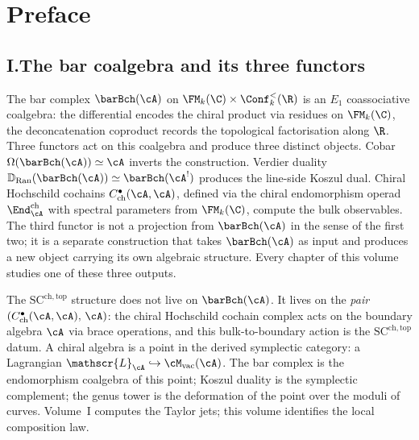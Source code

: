 \providecommand{\cL}{\mathscr{L}}
\providecommand{\cZ}{\mathcal{Z}}
\providecommand{\cH}{\mathcal{H}}
\providecommand{\fg}{\mathfrak{g}}
\providecommand{\cW}{\mathcal{W}}
\providecommand{\gSC}{\mathfrak{g}^{\mathrm{SC}}}
\providecommand{\gAmod}{\mathfrak{g}^{\mathrm{mod}}_\cA}
\providecommand{\Ydg}{Y^{\mathrm{dg}}}
\providecommand{\Zder}{\operatorname{Z}_{\mathrm{der}}}
\providecommand{\Abulk}{A_{\mathrm{bulk}}}
\providecommand{\Bbound}{B_{\partial}}
\providecommand{\mc}{\operatorname{MC}}
\providecommand{\Res}{\operatorname{Res}}
\providecommand{\RHom}{\operatorname{RHom}}

\chapter*{Preface}

\vspace{1em}

\section*{I.\quad The bar coalgebra and its three functors}

\noindent
The bar complex $\barBch(\cA)$ on
$\FM_k(\C) \times \Conf_k^{<}(\R)$ is an $E_1$ coassociative
coalgebra: the differential encodes the chiral product via
residues on $\FM_k(\C)$, the deconcatenation coproduct records
the topological factorisation along $\R$. Three functors act on
this coalgebra and produce three distinct objects. Cobar
$\Omega(\barBch(\cA)) \simeq \cA$ inverts the construction.
Verdier duality
$\mathbb{D}_{\mathrm{Ran}}(\barBch(\cA)) \simeq \barBch(\cA^!)$
produces the line-side Koszul dual. Chiral Hochschild cochains
$C^\bullet_{\mathrm{ch}}(\cA,\cA)$, defined via the chiral
endomorphism operad $\End^{\mathrm{ch}}_\cA$ with spectral
parameters from $\FM_k(\C)$, compute the bulk observables. The
third functor is not a projection from $\barBch(\cA)$ in the
sense of the first two; it is a separate construction that takes
$\barBch(\cA)$ as input and produces a new object carrying its
own algebraic structure. Every chapter of this volume studies one
of these three outputs.

The $\mathrm{SC}^{\mathrm{ch,top}}$ structure does not live on
$\barBch(\cA)$. It lives on the \emph{pair}
$(C^\bullet_{\mathrm{ch}}(\cA,\cA),\, \cA)$: the chiral
Hochschild cochain complex acts on the boundary algebra $\cA$
via brace operations, and this bulk-to-boundary action is the
$\mathrm{SC}^{\mathrm{ch,top}}$ datum. A chiral algebra is a
point in the derived symplectic category: a Lagrangian
$\cL_\cA \hookrightarrow \cM_{\mathrm{vac}}(\cA)$. The bar
complex is the endomorphism coalgebra of this point; Koszul
duality is the symplectic complement; the genus tower is the
deformation of the point over the moduli of curves. Volume~I
computes the Taylor jets; this volume identifies the local
composition law.


